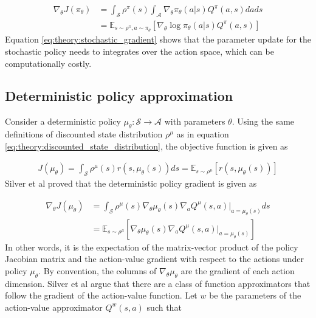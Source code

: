 \documentclass[class=book, crop=false]{standalone}
\begin{document}
\begin{equation}
   \begin{aligned}\label{eq:theory:stochastic_gradient}
    \nabla_{\theta} J(\pi_{\theta}) &= 
     \int_{\mathcal{S}}\rho^{\pi}(s)
     \int_{\mathcal{A}} \nabla_{\theta} \pi_{\theta}(a|s)Q^{\pi}(a,s)da ds
     \\
     &= \mathbb{E}_{s\sim \rho^{\pi},a \sim \pi_{\theta}}
     [\nabla_{\theta} \log \pi_{\theta}(a|s)Q^{\pi}(a,s) ]
\end{aligned} 
\end{equation}
Equation \eqref{eq:theory:stochastic_gradient} shows that the parameter update for the stochastic policy needs to integrates over the action space, which can be computationally costly.

\subsection{Deterministic policy approximation}
Consider a deterministic policy $\mu_{\theta}: \mathcal{S} \to \mathcal{A}$ with parameters $\theta$. Using the same definitions of discounted state distribution $\rho^{\mu}$ as in equation
\eqref{eq:theory:discounted_state_distribution}, the objective function is given as 

\begin{equation}
   \begin{aligned}\label{eq:theory:objective_expected_deterministic}
    J(\mu_{\theta}) =
    \int_{\mathcal{S}}
    \rho^{\mu}(s)r(s,\mu_{\theta}(s)) ds = \mathbb{E}_{s\sim \rho^{\mu}}[r(s,\mu_{\theta}(s))]
\end{aligned} 
\end{equation}
Silver et al \cite{pmlr-v32-silver14} proved that the deterministic policy gradient is given as 

\begin{equation}
   \begin{aligned}\label{eq:theory:objective_gradient_deterministic}
    \nabla_{\theta}J(\mu_{\theta}) &=
    \int_{\mathcal{S}}
    \rho^{\mu}(s)
    \nabla_{\theta} \mu_{\theta}(s)
    \nabla_{a} Q^{\mu}(s,a)|_{a = \mu_{\theta}(s)}ds 
    \\
    &= \mathbb{E}_{s\sim \rho^{\mu}}
    [    \nabla_{\theta} \mu_{\theta}(s)
    \nabla_{a} Q^{\mu}(s,a)|_{a = \mu_{\theta}(s)}]
\end{aligned} 
\end{equation}
In other words, it is the expectation of the matrix-vector product of the policy Jacobian matrix and the action-value gradient with respect to the actions under policy $\mu_{\theta}$. By convention, the columns of $\nabla_{\theta} \mu_{\theta}$ are the gradient of each action dimension. Silver et al argue that there are a class of function approximators that follow the gradient of the action-value function. Let $w$ be the parameters of the action-value approximator $Q^{w}(s,a)$ such that   
\end{document}
